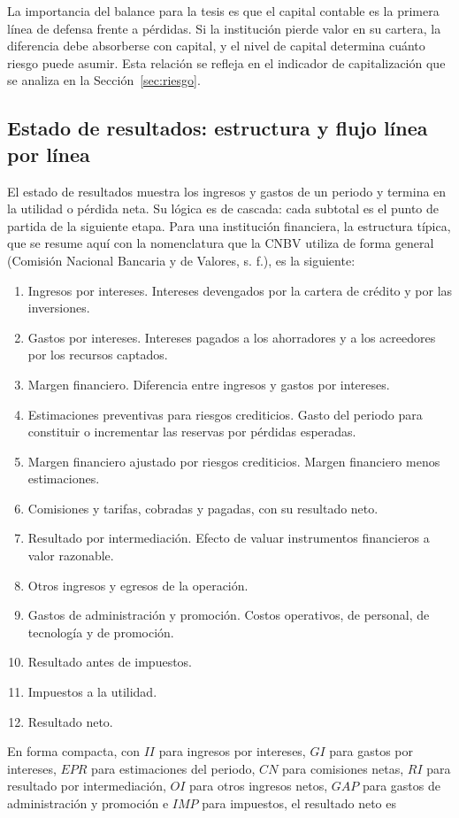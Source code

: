 La importancia del balance para la tesis es que el capital contable es la primera línea de defensa frente a pérdidas. Si la institución pierde valor en su cartera, la diferencia debe absorberse con capital, y el nivel de capital determina cuánto riesgo puede asumir. Esta relación se refleja en el indicador de capitalización que se analiza en la Sección~\ref{sec:riesgo}.

\subsection{Estado de resultados: estructura y flujo línea por línea}
El estado de resultados muestra los ingresos y gastos de un periodo y termina en la utilidad o pérdida neta. Su lógica es de cascada: cada subtotal es el punto de partida de la siguiente etapa. Para una institución financiera, la estructura típica, que se resume aquí con la nomenclatura que la CNBV utiliza de forma general (Comisión Nacional Bancaria y de Valores, s. f.), es la siguiente:
\begin{enumerate}[leftmargin=2em]
\item Ingresos por intereses. Intereses devengados por la cartera de crédito y por las inversiones.
\item Gastos por intereses. Intereses pagados a los ahorradores y a los acreedores por los recursos captados.
\item Margen financiero. Diferencia entre ingresos y gastos por intereses.
\item Estimaciones preventivas para riesgos crediticios. Gasto del periodo para constituir o incrementar las reservas por pérdidas esperadas.
\item Margen financiero ajustado por riesgos crediticios. Margen financiero menos estimaciones.
\item Comisiones y tarifas, cobradas y pagadas, con su resultado neto.
\item Resultado por intermediación. Efecto de valuar instrumentos financieros a valor razonable.
\item Otros ingresos y egresos de la operación.
\item Gastos de administración y promoción. Costos operativos, de personal, de tecnología y de promoción.
\item Resultado antes de impuestos.
\item Impuestos a la utilidad.
\item Resultado neto.
\end{enumerate}
En forma compacta, con $II$ para ingresos por intereses, $GI$ para gastos por intereses, $EPR$ para estimaciones del periodo, $CN$ para comisiones netas, $RI$ para resultado por intermediación, $OI$ para otros ingresos netos, $GAP$ para gastos de administración y promoción e $IMP$ para impuestos, el resultado neto es
